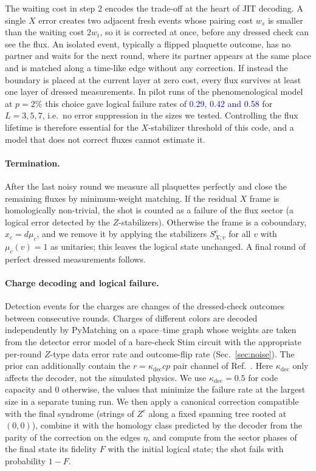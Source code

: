 \documentclass[a4paper]{article}
\newcommand{\blue}[1]{\textcolor{blue}{#1}}
\begin{document}
The waiting cost in step 2 encodes the trade-off at the heart of JIT decoding. A single $X$ error creates two adjacent fresh events whose pairing cost $w_s$ is smaller than the waiting cost $2w_t$, so it is corrected at once, before any dressed check can see the flux. An isolated event, typically a flipped plaquette outcome, has no partner and waits for the next round, where its partner appears at the same place and is matched along a time-like edge without any correction. If instead the boundary is placed at the current layer at zero cost, every flux survives at least one layer of dressed measurements. In pilot runs of the phenomenological model at $p=2\%$ this choice gave logical failure rates of \blue{0.29, 0.42 and 0.58} for $L=3,5,7$, i.e.\ no error suppression in the sizes we tested. Controlling the flux lifetime is therefore essential for the $X$-stabilizer threshold of this code, and a model that does not correct fluxes cannot estimate it.

\paragraph{Termination.}
After the last noisy round we measure all plaquettes perfectly and close the remaining fluxes by minimum-weight matching. If the residual $X$ frame is homologically non-trivial, the shot is counted as a failure of the flux sector (a logical error detected by the $Z$-stabilizers). Otherwise the frame is a coboundary, $x_c=d\mu_c$, and we remove it by applying the stabilizers $S^c_{X;v}$ for all $v$ with $\mu_c(v)=1$ as unitaries; this leaves the logical state unchanged. A final round of perfect dressed measurements follows.

\paragraph{Charge decoding and logical failure.}
Detection events for the charges are changes of the dressed-check outcomes between consecutive rounds. Charges of different colors are decoded independently by PyMatching on a space--time graph whose weights are taken from the detector error model of a bare-check Stim circuit with the appropriate per-round $Z$-type data error rate and outcome-flip rate (Sec.~\ref{sec:noise}). The prior can additionally contain the $r=\kappa_{\mathrm{dec}}cp$ pair channel of Ref.~\cite{haga2026aqis}. Here $\kappa_{\mathrm{dec}}$ only affects the decoder, not the simulated physics. We use $\kappa_{\mathrm{dec}}=0.5$ for code capacity and $0$ otherwise, the values that minimize the failure rate at the largest size in a separate tuning run. We then apply a canonical correction compatible with the final syndrome (strings of $Z^c$ along a fixed spanning tree rooted at $(0,0)$), combine it with the homology class predicted by the decoder from the parity of the correction on the edges $\eta$, and compute from the sector phases of the final state its fidelity $F$ with the initial logical state; the shot fails with probability $1-F$.
\end{document}
